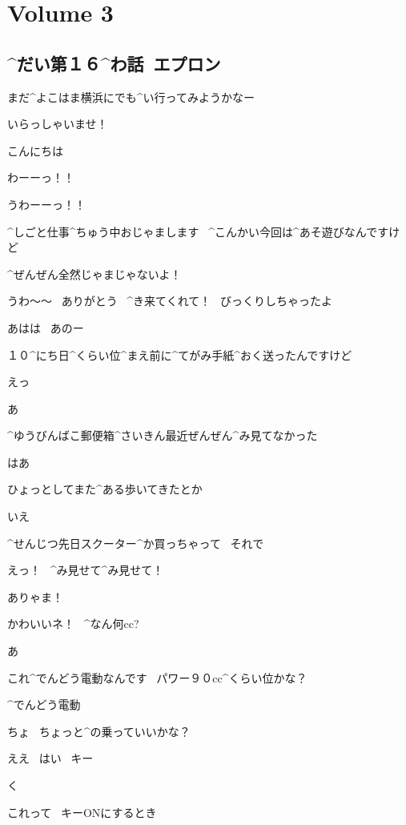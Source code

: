 \section{Volume 3}

\subsection{^{だい}{第}１６^{わ}{話}\ エプロン}

\page[5]
\Alpha まだ^{よこはま}{横浜}にでも^{い}{行}ってみようかなー

\Alpha いらっしゃいませ！

\page[6]
\Kokone こんにちは

\Alpha わーーっ！！

\Alpha うわーーっ！！

\page[7]
\Kokone ^{しごと}{仕事}^{ちゅう}{中}おじゃまします
\ ^{こんかい}{今回}は^{あそ}{遊}びなんですけど

\Alpha ^{ぜんぜん}{全然}じゃまじゃないよ！

\Alpha うわ〜〜
\ ありがとう
\ ^{き}{来}てくれて！
\ びっくりしちゃったよ

\Kokone あはは
\ あのー

\Kokone １０^{にち}{日}^{くらい}{位}^{まえ}{前}に^{てがみ}{手紙}^{おく}{送}ったんですけど

\Alpha えっ

\Alpha あ

\Alpha ^{ゆうびんばこ}{郵便箱}^{さいきん}{最近}ぜんぜん^{み}{見}てなかった

\Kokone はあ

\page[8]
\Alpha ひょっとしてまた^{ある}{歩}いてきたとか

\Kokone いえ

\Kokone ^{せんじつ}{先日}スクーター^{か}{買}っちゃって
\ それで

\Alpha えっ！
\ ^{み}{見}せて^{み}{見}せて！

\page[9]
\Alpha ありゃま！

\Alpha かわいいネ！
\ ^{なん}{何}cc?

\Kokone あ

\Kokone これ^{でんどう}{電動}なんです
\ パワー９０cc^{くらい}{位}かな？

\Alpha ^{でんどう}{電動}

\Alpha ちょ
\ ちょっと^{の}{乗}っていいかな？

\Kokone ええ
\ はい
\ キー

\page[10]
\Alpha く

\Alpha これって
\ キーONにするとき


